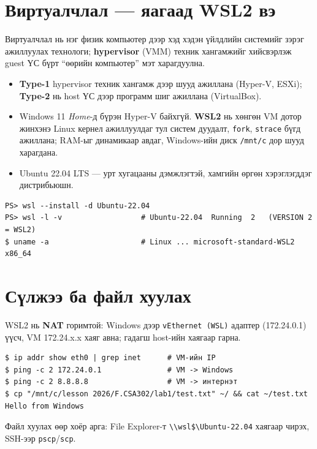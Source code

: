 \documentclass[12pt,a4paper]{article}
\begin{document}
\section{Виртуалчлал — яагаад WSL2 вэ}
Виртуалчлал нь нэг физик компьютер дээр хэд хэдэн үйлдлийн системийг зэрэг ажиллуулах технологи; \textbf{hypervisor} (VMM) техник хангамжийг хийсвэрлэж guest ҮС бүрт “өөрийн компьютер” мэт харагдуулна.
\begin{itemize}[leftmargin=1.5em]
  \item \textbf{Type-1} hypervisor техник хангамж дээр шууд ажиллана (Hyper-V, ESXi); \textbf{Type-2} нь host ҮС дээр программ шиг ажиллана (VirtualBox).
  \item Windows 11 \emph{Home}-д бүрэн Hyper-V байхгүй. \textbf{WSL2} нь хөнгөн VM дотор жинхэнэ Linux кернел ажиллуулдаг тул систем дуудалт, \texttt{fork}, \texttt{strace} бүгд ажиллана; RAM-ыг динамикаар авдаг, Windows-ийн диск \texttt{/mnt/c} дор шууд харагдана.
  \item Ubuntu 22.04 LTS — урт хугацааны дэмжлэгтэй, хамгийн өргөн хэрэглэгддэг дистрибьюшн.
\end{itemize}
\begin{lstlisting}
PS> wsl --install -d Ubuntu-22.04
PS> wsl -l -v                  # Ubuntu-22.04  Running  2   (VERSION 2 = WSL2)
$ uname -a                     # Linux ... microsoft-standard-WSL2 x86_64
\end{lstlisting}

\section{Сүлжээ ба файл хуулах}
WSL2 нь \textbf{NAT} горимтой: Windows дээр \texttt{vEthernet (WSL)} адаптер (172.24.0.1) үүсч, VM 172.24.x.x хаяг авна; гадагш host-ийн хаягаар гарна.
\begin{lstlisting}
$ ip addr show eth0 | grep inet      # VM-ийн IP
$ ping -c 2 172.24.0.1               # VM -> Windows
$ ping -c 2 8.8.8.8                  # VM -> интернэт
$ cp "/mnt/c/lesson 2026/F.CSA302/lab1/test.txt" ~/ && cat ~/test.txt
Hello from Windows
\end{lstlisting}
Файл хуулах өөр хоёр арга: File Explorer-т \texttt{\textbackslash\textbackslash wsl\$\textbackslash Ubuntu-22.04} хаягаар чирэх, SSH-ээр \texttt{pscp}/\texttt{scp}.
\end{document}
